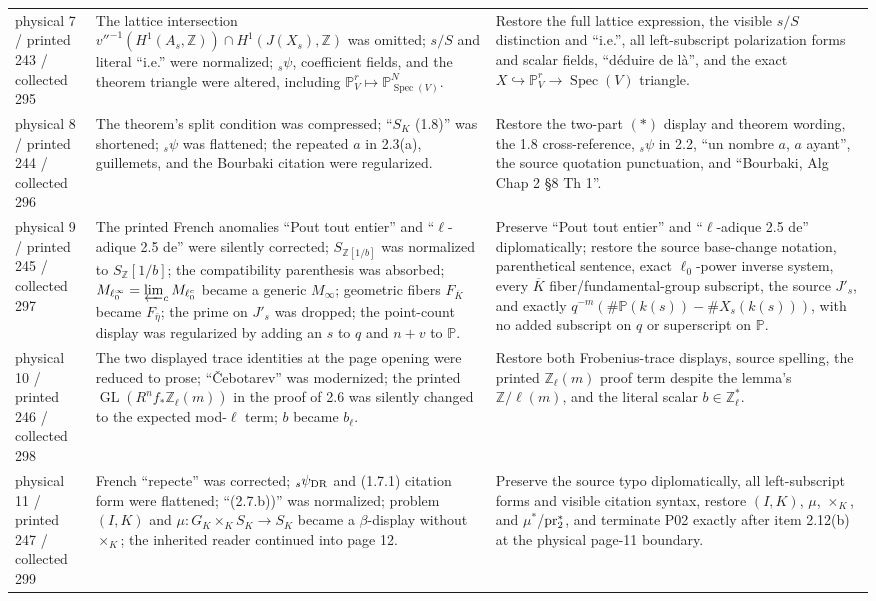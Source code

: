 \documentclass[10pt]{article}
\newcommand{\Pj}{\mathbb P}
\newcommand{\Z}{\mathbb Z}
\newcommand{\GL}{\operatorname{GL}}
\newcommand{\Spec}{\operatorname{Spec}}
\begin{document}
\begin{longtable}{>{\raggedright\arraybackslash}p{.19\linewidth}>{\raggedright\arraybackslash}p{.35\linewidth}>{\raggedright\arraybackslash}p{.38\linewidth}}
physical 7 / printed 243 / collected 295 & The lattice intersection $v''^{-1}(H^1(A_s,\Z))\cap H^1(J(X_s),\Z)$ was omitted; $s/S$ and literal ``i.e.'' were normalized; ${}_s\psi$, coefficient fields, and the theorem triangle were altered, including $\Pj_V^r\mapsto\Pj^N_{\Spec(V)}$. & Restore the full lattice expression, the visible $s/S$ distinction and ``i.e.'', all left-subscript polarization forms and scalar fields, ``déduire de là'', and the exact $X\hookrightarrow\Pj_V^r\to\Spec(V)$ triangle.\\
physical 8 / printed 244 / collected 296 & The theorem's split condition was compressed; ``$S_K$ (1.8)'' was shortened; ${}_s\psi$ was flattened; the repeated $a$ in 2.3(a), guillemets, and the Bourbaki citation were regularized. & Restore the two-part $(*)$ display and theorem wording, the 1.8 cross-reference, ${}_s\psi$ in 2.2, ``un nombre $a$, $a$ ayant'', the source quotation punctuation, and ``Bourbaki, Alg Chap 2 \S8 Th 1''.\\
physical 9 / printed 245 / collected 297 & The printed French anomalies ``Pout tout entier'' and ``$\ell$-adique 2.5 de'' were silently corrected; $S_{\Z[1/b]}$ was normalized to $S_\Z[1/b]$; the compatibility parenthesis was absorbed; $M_{\ell_0^\infty}=\varprojlim_c M_{\ell_0^c}$ became a generic $M_\infty$; geometric fibers $F_{\overline K}$ became $F_{\bar\eta}$; the prime on $J'_s$ was dropped; the point-count display was regularized by adding an $s$ to $q$ and $n+v$ to $\Pj$. & Preserve ``Pout tout entier'' and ``$\ell$-adique 2.5 de'' diplomatically; restore the source base-change notation, parenthetical sentence, exact $\ell_0$-power inverse system, every $\overline K$ fiber/fundamental-group subscript, the source $J'_s$, and exactly $q^{-m}(\#\Pj(k(s))-\#X_s(k(s)))$, with no added subscript on $q$ or superscript on $\Pj$.\\
physical 10 / printed 246 / collected 298 & The two displayed trace identities at the page opening were reduced to prose; ``\v Cebotarev'' was modernized; the printed $\GL(R^nf_*\Z_\ell(m))$ in the proof of 2.6 was silently changed to the expected mod-$\ell$ term; $b$ became $b_\ell$. & Restore both Frobenius-trace displays, source spelling, the printed $\Z_\ell(m)$ proof term despite the lemma's $\Z/\ell(m)$, and the literal scalar $b\in\Z_\ell^*$.\\
physical 11 / printed 247 / collected 299 & French ``repecte'' was corrected; ${}_s\psi_{\rm DR}$ and (1.7.1) citation form were flattened; ``(2.7.b))'' was normalized; problem $(I,K)$ and $\mu:G_K\times_K S_K\to S_K$ became a $\beta$-display without $\times_K$; the inherited reader continued into page 12. & Preserve the source typo diplomatically, all left-subscript forms and visible citation syntax, restore $(I,K)$, $\mu$, $\times_K$, and $\mu^*$/${\rm pr}_2^*$, and terminate P02 exactly after item 2.12(b) at the physical page-11 boundary.\\


\end{longtable}
\end{document}
